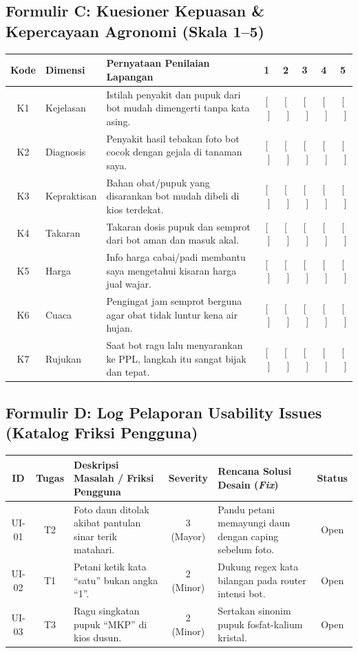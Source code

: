\documentclass[11pt,a4paper]{article}
\begin{document}
\subsection{Formulir C: Kuesioner Kepuasan \& Kepercayaan Agronomi (Skala 1--5)}
\begin{table}[htbp]
\centering
\small
\begin{tabularx}{\textwidth}{c l X c c c c c}
\toprule
\textbf{Kode} & \textbf{Dimensi} & \textbf{Pernyataan Penilaian Lapangan} & \textbf{1} & \textbf{2} & \textbf{3} & \textbf{4} & \textbf{5} \\
\midrule
K1 & Kejelasan & Istilah penyakit dan pupuk dari bot mudah dimengerti tanpa kata asing. & [ \ ] & [ \ ] & [ \ ] & [ \ ] & [ \ ] \\
K2 & Diagnosis & Penyakit hasil tebakan foto bot cocok dengan gejala di tanaman saya. & [ \ ] & [ \ ] & [ \ ] & [ \ ] & [ \ ] \\
K3 & Kepraktisan & Bahan obat/pupuk yang disarankan bot mudah dibeli di kios terdekat. & [ \ ] & [ \ ] & [ \ ] & [ \ ] & [ \ ] \\
K4 & Takaran & Takaran dosis pupuk dan semprot dari bot aman dan masuk akal. & [ \ ] & [ \ ] & [ \ ] & [ \ ] & [ \ ] \\
K5 & Harga & Info harga cabai/padi membantu saya mengetahui kisaran harga jual wajar. & [ \ ] & [ \ ] & [ \ ] & [ \ ] & [ \ ] \\
K6 & Cuaca & Pengingat jam semprot berguna agar obat tidak luntur kena air hujan. & [ \ ] & [ \ ] & [ \ ] & [ \ ] & [ \ ] \\
K7 & Rujukan & Saat bot ragu lalu menyarankan ke PPL, langkah itu sangat bijak dan tepat. & [ \ ] & [ \ ] & [ \ ] & [ \ ] & [ \ ] \\
\bottomrule
\end{tabularx}
\end{table}

\subsection{Formulir D: Log Pelaporan Usability Issues (Katalog Friksi Pengguna)}
\begin{table}[htbp]
\centering
\small
\begin{tabularx}{\textwidth}{c c X c X c}
\toprule
\textbf{ID} & \textbf{Tugas} & \textbf{Deskripsi Masalah / Friksi Pengguna} & \textbf{Severity} & \textbf{Rencana Solusi Desain (\textit{Fix})} & \textbf{Status} \\
\midrule
UI-01 & T2 & Foto daun ditolak akibat pantulan sinar terik matahari. & 3 (Mayor) & Pandu petani memayungi daun dengan caping sebelum foto. & Open \\
UI-02 & T1 & Petani ketik kata ``satu'' bukan angka ``1''. & 2 (Minor) & Dukung regex kata bilangan pada router intensi bot. & Open \\
UI-03 & T3 & Ragu singkatan pupuk ``MKP'' di kios dusun. & 2 (Minor) & Sertakan sinonim pupuk fosfat-kalium kristal. & Open \\
\bottomrule
\end{tabularx}
\end{table}
\end{document}
